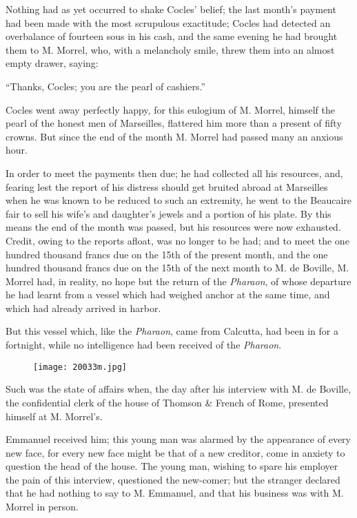 Nothing had as yet occurred to shake Cocles’ belief; the last month’s
payment had been made with the most scrupulous exactitude; Cocles had
detected an overbalance of fourteen sous in his cash, and the same
evening he had brought them to M. Morrel, who, with a melancholy smile,
threw them into an almost empty drawer, saying:

“Thanks, Cocles; you are the pearl of cashiers.”

Cocles went away perfectly happy, for this eulogium of M. Morrel,
himself the pearl of the honest men of Marseilles, flattered him more
than a present of fifty crowns. But since the end of the month M.
Morrel had passed many an anxious hour.

In order to meet the payments then due; he had collected all his
resources, and, fearing lest the report of his distress should get
bruited abroad at Marseilles when he was known to be reduced to such an
extremity, he went to the Beaucaire fair to sell his wife’s and
daughter’s jewels and a portion of his plate. By this means the end of
the month was passed, but his resources were now exhausted. Credit,
owing to the reports afloat, was no longer to be had; and to meet the
one hundred thousand francs due on the 15th of the present month, and
the one hundred thousand francs due on the 15th of the next month to M.
de Boville, M. Morrel had, in reality, no hope but the return of the
\textit{Pharaon}, of whose departure he had learnt from a vessel which had
weighed anchor at the same time, and which had already arrived in
harbor.

But this vessel which, like the \textit{Pharaon}, came from Calcutta, had been
in for a fortnight, while no intelligence had been received of the
\textit{Pharaon}.

\begin{figure}[ht]
\texttt{[image: 20033m.jpg]}
\end{figure}

Such was the state of affairs when, the day after his interview with M.
de Boville, the confidential clerk of the house of Thomson \& French of
Rome, presented himself at M. Morrel’s.

Emmanuel received him; this young man was alarmed by the appearance of
every new face, for every new face might be that of a new creditor,
come in anxiety to question the head of the house. The young man,
wishing to spare his employer the pain of this interview, questioned
the new-comer; but the stranger declared that he had nothing to say to
M. Emmanuel, and that his business was with M. Morrel in person.

